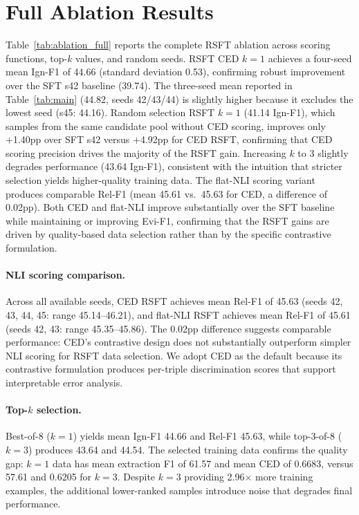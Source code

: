 \section{Full Ablation Results}
\label{sec:ablation_full}

Table~\ref{tab:ablation_full} reports the complete RSFT ablation across scoring functions, top-$k$ values, and random seeds. RSFT CED $k{=}1$ achieves a four-seed mean Ign-F1 of 44.66 (standard deviation 0.53), confirming robust improvement over the SFT s42 baseline (39.74). The three-seed mean reported in Table~\ref{tab:main} (44.82, seeds 42/43/44) is slightly higher because it excludes the lowest seed (s45: 44.16). Random selection RSFT $k{=}1$ (41.14 Ign-F1), which samples from the same candidate pool without CED scoring, improves only +1.40pp over SFT s42 versus +4.92pp for CED RSFT, confirming that CED scoring precision drives the majority of the RSFT gain. Increasing $k$ to 3 slightly degrades performance (43.64 Ign-F1), consistent with the intuition that stricter selection yields higher-quality training data. The flat-NLI scoring variant produces comparable Rel-F1 (mean 45.61 vs.\ 45.63 for CED, a difference of 0.02pp). Both CED and flat-NLI improve substantially over the SFT baseline while maintaining or improving Evi-F1, confirming that the RSFT gains are driven by quality-based data selection rather than by the specific contrastive formulation.

\paragraph{NLI scoring comparison.} Across all available seeds, CED RSFT achieves mean Rel-F1 of 45.63 (seeds 42, 43, 44, 45: range 45.14--46.21), and flat-NLI RSFT achieves mean Rel-F1 of 45.61 (seeds 42, 43: range 45.35--45.86). The 0.02pp difference suggests comparable performance: CED's contrastive design does not substantially outperform simpler NLI scoring for RSFT data selection. We adopt CED as the default because its contrastive formulation produces per-triple discrimination scores that support interpretable error analysis.

\paragraph{Top-$k$ selection.} Best-of-8 ($k{=}1$) yields mean Ign-F1 44.66 and Rel-F1 45.63, while top-3-of-8 ($k{=}3$) produces 43.64 and 44.54. The selected training data confirms the quality gap: $k{=}1$ data has mean extraction F1 of 61.57 and mean CED of 0.6683, versus 57.61 and 0.6205 for $k{=}3$. Despite $k{=}3$ providing 2.96$\times$ more training examples, the additional lower-ranked samples introduce noise that degrades final performance.

